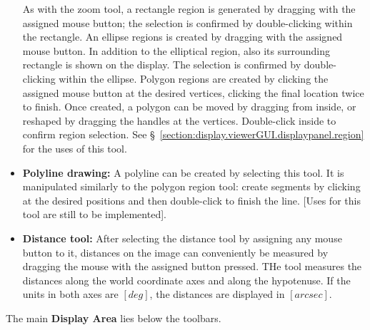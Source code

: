 \begin{itemize}
     As with the zoom tool, a rectangle region is generated by dragging with
     the assigned mouse button; the selection is confirmed by double-clicking
     within the rectangle.
     An ellipse regions is created by dragging with the assigned mouse button.
     In addition to the elliptical region, also its surrounding rectangle is
     shown on the display. The selection is confirmed by double-clicking within
     the ellipse.
     Polygon regions are created by clicking the assigned mouse button
     at the desired vertices, clicking the final location twice to finish.
     Once created, a polygon can be moved by dragging from inside, or
     reshaped by dragging the handles at the vertices.  Double-click inside to
     confirm region selection.
     See \S~\ref{section:display.viewerGUI.displaypanel.region} for the uses
     of this tool.
   \item {\bf Polyline drawing:}
     A polyline can be created by selecting this tool. It is manipulated
     similarly to the polygon region tool: create segments by clicking at
     the desired positions and then double-click to finish the line.
     [Uses for this tool are still to be implemented].
   \item {\bf Distance tool:}
     After selecting the distance tool by assigning any mouse button to it,
     distances on the image can conveniently be measured by dragging the
     mouse with the assigned button pressed. THe tool measures the distances
     along the world coordinate axes and along the hypotenuse. If the units
     in both axes are $[deg]$, the distances are displayed in $[arcsec]$.
\end{itemize}

The main {\bf Display Area} lies below the toolbars.

